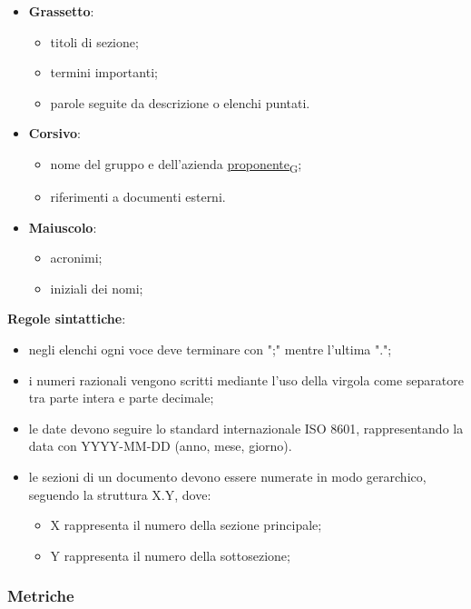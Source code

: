 \begin{itemize}
	\item \textbf{Grassetto}:
	      \begin{itemize}
		      \item titoli di sezione;
		      \item termini importanti;
		      \item parole seguite da descrizione o elenchi puntati.
	      \end{itemize}
	\item \textbf{Corsivo}:
	      \begin{itemize}
		      \item nome del gruppo e dell'azienda \href{https://7last.github.io/docs/rtb/documentazione-interna/glossario\#proponente}{proponente\textsubscript{G}};
		      \item riferimenti a documenti esterni.
	      \end{itemize}
	\item \textbf{Maiuscolo}:
	      \begin{itemize}
		      \item acronimi;
		      \item iniziali dei nomi;
	      \end{itemize}
\end{itemize}
\newpage
\textbf{Regole sintattiche}:
\begin{itemize}
	\item negli elenchi ogni voce deve terminare con ";" mentre l'ultima ".";
	\item i numeri razionali vengono scritti mediante l'uso della virgola come separatore tra parte intera e parte decimale;
	\item le date devono seguire lo standard internazionale ISO 8601, rappresentando la data con YYYY-MM-DD (anno, mese, giorno).
	\item le sezioni di un documento devono essere numerate in modo gerarchico, seguendo la struttura X.Y, dove:
	      \begin{itemize}
		      \item X rappresenta il numero della sezione principale;
		      \item Y rappresenta il numero della sottosezione;
	      \end{itemize}
\end{itemize}

\subsubsection{Metriche}

